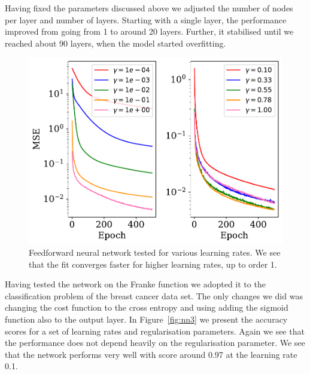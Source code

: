 \documentclass[a4paper, 
amsfonts, 
amssymb, 
amsmath, 
reprint, 
showkeys, 
nofootinbib, 
twoside]{revtex4-2}
\begin{document}
Having fixed the parameters discussed above we adjusted the number of nodes per layer and number of layers. Starting with a single layer, the performance improved from going from 1 to around 20 layers. Further, it stabilised until we reached about 90 layers, when the model started overfitting.

\begin{figure}
    \centering
    \includegraphics[width = \columnwidth]{Figures/lr_test.pdf}
    \caption{Feedforward neural network tested for various learning rates. We see that the fit converges faster for higher learning rates, up to order 1.}
    \label{fig:nn1}
\end{figure}

Having tested the network on the Franke function we adopted it to the classification problem of the breast cancer data set. The only changes we did was changing the cost function to the cross entropy and using adding the sigmoid function also to the output layer. In Figure~\ref{fig:nn3} we present the accuracy scores for a set of learning rates and regularisation parameters. Again we see that the performance does not depend heavily on the regularisation parameter. We see that the network performs very well with score around 0.97 at the learning rate 0.1.
\end{document}
